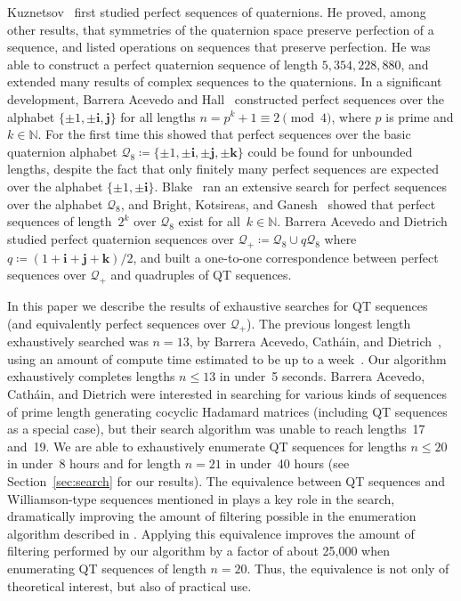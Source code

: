\documentclass[12pt]{article}
\numberwithin{equation}{section}
\newcommand{\qi}{\mathbf{i}}
\newcommand{\qj}{\mathbf{j}}
\newcommand{\qk}{\mathbf{k}}
\newcommand{\N}{\mathbb{N}}
\newcommand{\Q}{\mathcal{Q}}
\newcommand{\union}{\cup}
\newcommand{\eqdef}{\coloneqq}
\begin{document}
Kuznetsov~\cite{Kuznetsov2009} first studied perfect sequences of quaternions. He proved, among other results, that symmetries of the quaternion space preserve perfection of a sequence, and listed operations on sequences that preserve perfection.
He was able to construct a perfect quaternion sequence of length $5{,}354{,}228{,}880$, and extended many results of complex sequences to the quaternions.
In a significant development, Barrera Acevedo and Hall~\cite{AcevedoHall2012} constructed perfect sequences over the alphabet $\{\pm1,\pm\qi,\qj\}$ for all lengths $n=p^k+1\equiv2\pmod{4}$, where $p$ is prime and $k\in\N$.
For the first time this showed that perfect sequences over the basic quaternion
alphabet $\Q_8 \eqdef \{\pm1, \pm\qi, \pm\qj, \pm\qk\}$ could be found for unbounded lengths,
despite the fact that only finitely many perfect sequences are expected over the alphabet $\{\pm1,\pm\qi\}$.
Blake~\cite{BT17} ran an extensive search for perfect sequences over the alphabet $\Q_8$,
and Bright, Kotsireas, and Ganesh~\cite{BKG20-perfect-sequences} showed that perfect sequences of length~$2^k$ over $\Q_8$ exist for all~$k\in\N$.
Barrera Acevedo and Dietrich~\cite{BAD18} studied perfect quaternion sequences over $\Q_+ \eqdef \Q_8 \union q\Q_8$ where $q \eqdef (1+\qi+\qj+\qk)/2$, and built a one-to-one correspondence between perfect sequences over $\Q_+$ and quadruples of QT sequences.

In this paper we describe the results of exhaustive searches
for QT sequences (and equivalently
perfect sequences over $\Q_+$).
The previous longest length exhaustively searched was $n=13$, by Barrera Acevedo, Catháin, and Dietrich~\cite{BarreraAcevedo2019},
using an amount of compute time estimated to be up to a week~\cite{personal}.
Our algorithm exhaustively completes lengths $n\leq13$ in under~5 seconds.
Barrera Acevedo, Catháin, and Dietrich were interested in searching for
various kinds of sequences of prime length generating cocyclic Hadamard matrices (including
QT sequences as a special case),
but their search algorithm was unable to reach lengths~17 and~19.
We are able to exhaustively enumerate QT sequences
for lengths $n\leq20$ in under~8 hours and for length $n=21$ in under~40 hours
(see Section~\ref{sec:search} for our results).
The equivalence between QT sequences and Williamson-type sequences mentioned in  plays a key role in the search, dramatically improving the amount
of filtering possible in the enumeration algorithm described in .
Applying this equivalence
improves the amount of filtering performed by our algorithm
by a factor of about 25,000 when enumerating QT sequences of length $n=20$.
Thus, the equivalence is not only of theoretical interest, but also of practical use.
\end{document}
